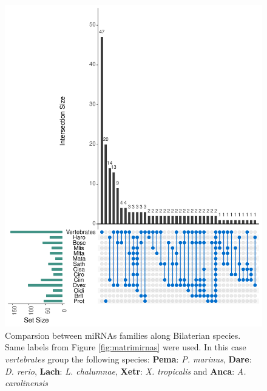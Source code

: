 \documentclass[graybox]{svmult}
\begin{document}
\begin{figure}[ht!]
\centering
\includegraphics[width=\textwidth]{./Images/vennmiRNAs}
\caption{Comparsion between miRNAs families along Bilaterian species. Same 
labels from Figure \ref{fig:matrimirnas} were used. In this case 
\textsl{vertebrates} group the following species: \textbf{Pema}: \textit{P. 
marinus}, \textbf{Dare}: \textit{D. rerio}, \textbf{Lach}: \textit{L. 
chalumnae}, \textbf{Xetr}: \textit{X. tropicalis} and \textbf{Anca}: \textit{A. 
carolinensis}}
\label{fig:vennDiagram}
\end{figure}
\end{document}
